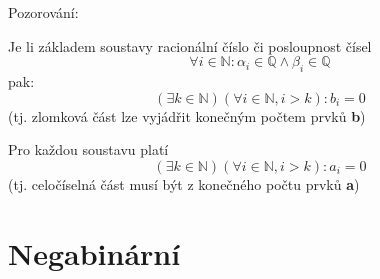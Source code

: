 \documentclass[12pt]{book}
\begin{document}
\newpage
Pozorování:


Je li základem soustavy racionální číslo či posloupnost čísel
$$\forall i \in \mathbb{N} : \alpha_i \in \mathbb{Q} \land \beta_i \in \mathbb{Q}$$
pak:
$$ (\exists k \in \mathbb{N} )(\forall i \in \mathbb{N}, i>k): b_i = 0 $$
(tj. zlomková část lze vyjádřit konečným počtem prvků \textbf{b})\newline \newline

Pro každou soustavu platí
$$ (\exists k \in \mathbb{N} )(\forall i \in \mathbb{N}, i>k): a_i = 0 $$
(tj. celočíselná část musí být  z konečného počtu prvků \textbf{a})






\chapter{Negabinární}
\end{document}
